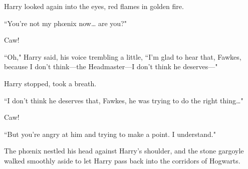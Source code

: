 Harry looked again into the eyes, red flames in golden fire.

``You're not my phœnix now{\ldots} are you?"

Caw!

``Oh," Harry said, his voice trembling a little, ``I'm glad to hear that, Fawkes, because I don't think—the Headmaster—I don't think he deserves—"

Harry stopped, took a breath.

``I don't think he deserves that, Fawkes, he was trying to do the right thing{\ldots}"

Caw!

``But you're angry at him and trying to make a point. I understand."

The phœnix nestled his head against Harry's shoulder, and the stone gargoyle walked smoothly aside to let Harry pass back into the corridors of Hogwarts.

